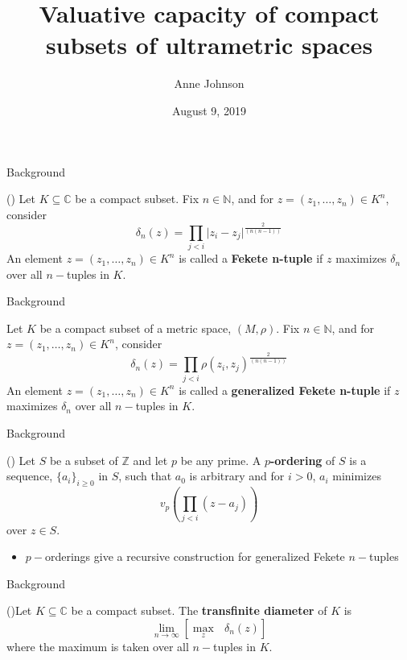 \documentclass{beamer}
\title{Valuative capacity of compact subsets of ultrametric spaces}
\author{Anne Johnson}
\date{August 9, 2019}
\theoremstyle{definition}
\begin{document}
\maketitle

\begin{frame}{Background}
\begin{definition}	
(\cite{fek}) Let $K \subseteq \mathbb{C}$ be a compact subset. Fix $n \in \mathbb{N}$, and for $z = (z_1,\ldots,z_n) \in K^n$, consider
\[\delta_n(z) = \prod_{j < i} \lvert z_i - z_j \rvert^{\frac{2}{(n(n-1))}} \]
An element $z = (z_1,\ldots,z_n) \in K^n$ is called a \textbf{Fekete n-tuple} if $z$ maximizes $\delta_n$ over all $n-$tuples in $K$.
\end{definition}
\end{frame}

\begin{frame}{Background}
	\begin{definition}	
		 Let $K$ be a compact subset of a metric space, $(M,\rho)$. Fix $n \in \mathbb{N}$, and for $z = (z_1,\ldots,z_n) \in K^n$, consider
		\[\delta_n(z) = \prod_{j < i} \rho(z_i, z_j)^{\frac{2}{(n(n-1))}} \]
		An element $z = (z_1,\ldots,z_n) \in K^n$ is called a \textbf{generalized Fekete n-tuple} if $z$ maximizes $\delta_n$ over all $n-$tuples in $K$.
	\end{definition}
\end{frame}

\begin{frame}{Background}
 \begin{definition}
		(\cite{mb1}) Let $S$ be a subset of $\mathbb{Z}$  and let $p$ be any prime. A \textbf{$p$-ordering} of $S$ is a sequence, $\{a_i\}_{i\geq 0}$ in $S$, such that $a_0$ is arbitrary and for $i >0$, $a_i$ minimizes 
		\[ v_p (\prod_{j < i} (z - a_j) )\] over $z \in S$.\\
 \end{definition}
	\pause
 \begin{itemize}
		\item $p-$orderings give a recursive construction for generalized Fekete $n-$tuples\only<+->{!}  
 \end{itemize}	
\end{frame}

\begin{frame}{Background}
\begin{definition}	
	(\cite{fek})Let $K \subseteq \mathbb{C}$ be a compact subset. The \textbf{transfinite diameter} of $K$ is \[ \lim_{n\to\infty} [ \max_z \text{ } \delta_n(z)]\] where the maximum is taken over all $n-$tuples in $K$. %
\end{definition}
\end{frame}
\end{document}
